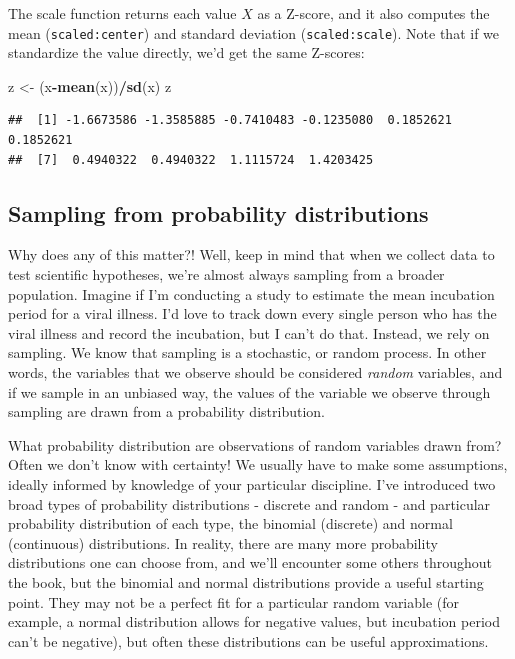\documentclass[
]{book}
\newenvironment{Shaded}{\begin{snugshade}}{\end{snugshade}}
\newcommand{\FunctionTok}[1]{\textcolor[rgb]{0.13,0.29,0.53}{\textbf{#1}}}
\newcommand{\NormalTok}[1]{#1}
\newcommand{\OtherTok}[1]{\textcolor[rgb]{0.56,0.35,0.01}{#1}}
\newcommand{\SpecialCharTok}[1]{\textcolor[rgb]{0.81,0.36,0.00}{\textbf{#1}}}
\begin{document}
The scale function returns each value \(X\) as a Z-score, and it also computes the mean (\texttt{scaled:center}) and standard deviation (\texttt{scaled:scale}). Note that if we standardize the value directly, we'd get the same Z-scores:

\begin{Shaded}
\begin{Highlighting}[]
\NormalTok{z }\OtherTok{\textless{}{-}}\NormalTok{ (x}\SpecialCharTok{{-}}\FunctionTok{mean}\NormalTok{(x))}\SpecialCharTok{/}\FunctionTok{sd}\NormalTok{(x)}
\NormalTok{z}
\end{Highlighting}
\end{Shaded}

\begin{verbatim}
##  [1] -1.6673586 -1.3585885 -0.7410483 -0.1235080  0.1852621  0.1852621
##  [7]  0.4940322  0.4940322  1.1115724  1.4203425
\end{verbatim}

\subsection{Sampling from probability distributions}\label{sampling-from-probability-distributions-1}

Why does any of this matter?! Well, keep in mind that when we collect data to test scientific hypotheses, we're almost always sampling from a broader population. Imagine if I'm conducting a study to estimate the mean incubation period for a viral illness. I'd love to track down every single person who has the viral illness and record the incubation, but I can't do that. Instead, we rely on sampling. We know that sampling is a stochastic, or random process. In other words, the variables that we observe should be considered \emph{random} variables, and if we sample in an unbiased way, the values of the variable we observe through sampling are drawn from a probability distribution.

What probability distribution are observations of random variables drawn from? Often we don't know with certainty! We usually have to make some assumptions, ideally informed by knowledge of your particular discipline. I've introduced two broad types of probability distributions - discrete and random - and particular probability distribution of each type, the binomial (discrete) and normal (continuous) distributions. In reality, there are many more probability distributions one can choose from, and we'll encounter some others throughout the book, but the binomial and normal distributions provide a useful starting point. They may not be a perfect fit for a particular random variable (for example, a normal distribution allows for negative values, but incubation period can't be negative), but often these distributions can be useful approximations.
\end{document}
